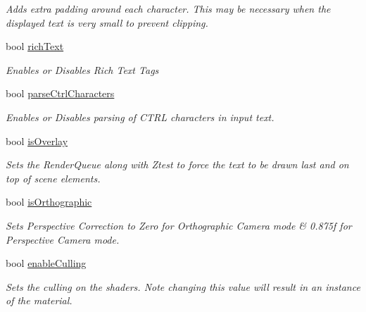 \begin{DoxyCompactItemize}
\begin{DoxyCompactList}\small\item\em Adds extra padding around each character. This may be necessary when the displayed text is very small to prevent clipping. \end{DoxyCompactList}\item 
bool \mbox{\hyperlink{class_t_m_pro_1_1_t_m_p___text_a3d9afda5078a7e48a52206736facf972}{rich\+Text}}
\begin{DoxyCompactList}\small\item\em Enables or Disables Rich Text Tags \end{DoxyCompactList}\item 
bool \mbox{\hyperlink{class_t_m_pro_1_1_t_m_p___text_affe0b3909ff65dc33124c160a081accd}{parse\+Ctrl\+Characters}}
\begin{DoxyCompactList}\small\item\em Enables or Disables parsing of C\+T\+RL characters in input text. \end{DoxyCompactList}\item 
bool \mbox{\hyperlink{class_t_m_pro_1_1_t_m_p___text_ac3d29530dd5635c1649496be1b6b7613}{is\+Overlay}}
\begin{DoxyCompactList}\small\item\em Sets the Render\+Queue along with Ztest to force the text to be drawn last and on top of scene elements. \end{DoxyCompactList}\item 
bool \mbox{\hyperlink{class_t_m_pro_1_1_t_m_p___text_a00f0401315f7bc45fb8922b8284e894b}{is\+Orthographic}}
\begin{DoxyCompactList}\small\item\em Sets Perspective Correction to Zero for Orthographic Camera mode \& 0.\+875f for Perspective Camera mode. \end{DoxyCompactList}\item 
bool \mbox{\hyperlink{class_t_m_pro_1_1_t_m_p___text_ae03e9f67ef0b2d504e508ec4505f78c7}{enable\+Culling}}
\begin{DoxyCompactList}\small\item\em Sets the culling on the shaders. Note changing this value will result in an instance of the material. \end{DoxyCompactList}\item 

\end{DoxyCompactItemize}
